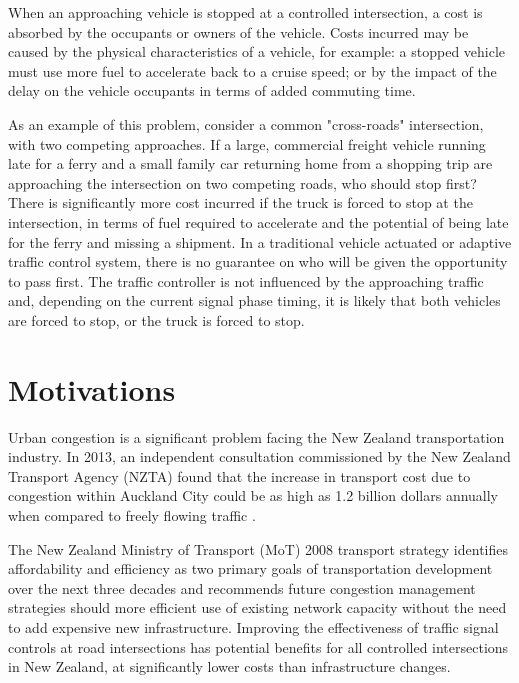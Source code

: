 When an approaching vehicle is stopped at a controlled intersection, a cost is absorbed by the occupants or owners of the vehicle. Costs incurred may be caused by the physical characteristics of a vehicle, for example: a stopped vehicle must use more fuel to accelerate back to a cruise speed; or by the impact of the delay on the vehicle occupants in terms of added commuting time.

As an example of this problem, consider a common "cross-roads" intersection, with two competing approaches. If a large, commercial freight vehicle running late for a ferry and a small family car returning home from a shopping trip are approaching the intersection on two competing roads, who should stop first? There is significantly more cost incurred if the truck is forced to stop at the intersection, in terms of fuel required to accelerate and the potential of being late for the ferry and missing a shipment. In a traditional vehicle actuated or adaptive traffic control system, there is no guarantee on who will be given the opportunity to pass first. The traffic controller is not influenced by the approaching traffic and, depending on the current signal phase timing, it is likely that both vehicles are forced to stop, or the truck is forced to stop. 


\section {Motivations}

Urban congestion is a significant problem facing the New Zealand transportation industry. In 2013, an independent consultation commissioned by the New Zealand Transport Agency (NZTA) found that the increase in transport cost due to congestion within Auckland City could be as high as 1.2 billion dollars annually when compared to freely flowing traffic \cite{wallis2013costs}. 

The New Zealand Ministry of Transport (MoT) 2008 transport strategy identifies affordability and efficiency as two primary goals of transportation development over the next three decades and recommends future congestion management strategies should more efficient use of existing network capacity without the need to add expensive new infrastructure. Improving the effectiveness of traffic signal controls at road intersections has potential benefits for all controlled intersections in New Zealand, at significantly lower costs than infrastructure changes.

